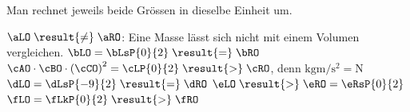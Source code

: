 Man rechnet jeweils beide Grössen in dieselbe Einheit um.
\begin{abcliste}
\abc $\aLO \;\result{\neq}\; \aRO$: Eine Masse lässt sich nicht mit einem Volumen vergleichen.
\abc $\bLO = \bLsP{0}{2} \;\result{=}\; \bRO$
\abc $\cAO\cdot\cBO\cdot\left(\cCO\right)^2 = \cLP{0}{2} \;\result{>}\; \cRO$, denn $\si{\kilo\gram\meter\per\second\squared} = \si{\newton}$
\abc $\dLO = \dLsP{-9}{2} \;\result{=}\; \dRO$
\abc $\eLO \;\result{>}\; \eRO = \eRsP{0}{2}$
\abc $\fLO = \fLkP{0}{2} \;\result{>}\; \fRO$
\end{abcliste}

